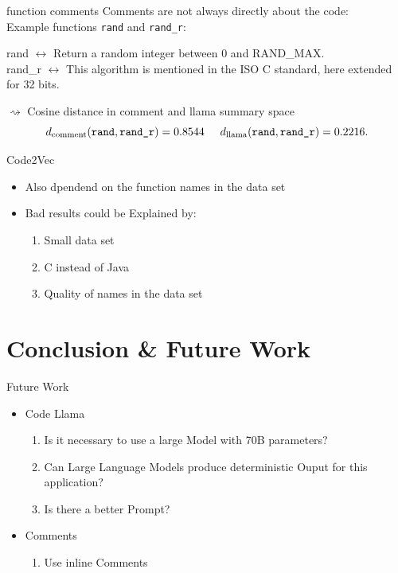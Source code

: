\documentclass[aspectratio=1610,12pt]{beamer}
\begin{document}
\begin{frame}{function comments}
  Comments are not always directly about the code:\\
  Example functions \texttt{rand} and \texttt{rand\_r}:
  \begin{center}
    rand $\leftrightarrow$ Return a random integer between 0
      and RAND\_MAX.\\
    rand\_r  $\leftrightarrow$ This algorithm is mentioned in 
    the ISO C standard, here extended for 32 bits.
  \end{center}
  $\rightsquigarrow$ Cosine distance in comment and 
  llama summary space
    \[
      d_\text{comment}(\texttt{rand}, \texttt{rand\_r}) = 0.8544
      \hspace{0.5cm}
      d_\text{llama}(\texttt{rand}, \texttt{rand\_r}) = 0.2216.
    \]
\end{frame}

\begin{frame}{Code2Vec}
  \begin{itemize}
    \item Also dpendend on the function names in the data set
    \item Bad results could be Explained by:
      \begin{enumerate}
        \item Small data set
        \item C instead of Java
        \item Quality of names in the data set
      \end{enumerate}
  \end{itemize}
\end{frame}

\section{Conclusion \& Future Work}
\begin{frame}{Future Work}
  \begin{itemize}
    \item Code Llama
      \begin{enumerate}
        \item Is it necessary to use a 
          large Model with 70B parameters?
        \item Can Large Language Models 
        produce deterministic Ouput for this application?
        \item Is there a better Prompt?
      \end{enumerate}
    \item Comments
      \begin{enumerate}
        \item Use inline Comments
      \end{enumerate}
  \end{itemize}
\end{frame}
\end{document}
